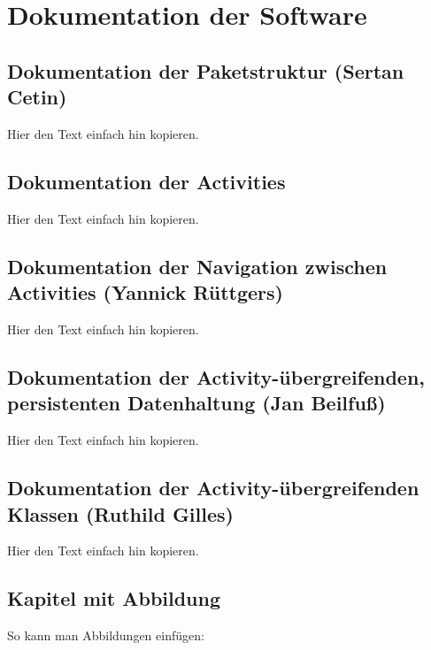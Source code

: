 \section{Dokumentation der Software}
\label{instal}

\subsection{Dokumentation der Paketstruktur (Sertan Cetin)}

Hier den Text einfach hin kopieren.

\subsection{Dokumentation der Activities}

Hier den Text einfach hin kopieren.

\subsection{Dokumentation der Navigation zwischen Activities (Yannick Rüttgers)}

Hier den Text einfach hin kopieren.

\subsection{Dokumentation der Activity-übergreifenden, persistenten Datenhaltung (Jan Beilfuß)}

Hier den Text einfach hin kopieren.

\subsection{Dokumentation der Activity-übergreifenden Klassen (Ruthild Gilles)}

Hier den Text einfach hin kopieren.


\subsection{Kapitel mit Abbildung}

So kann man Abbildungen einfügen:

